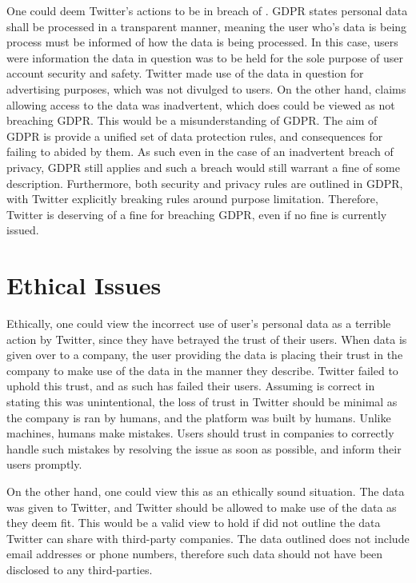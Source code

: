 \documentclass[a4paper, 11pt]{article}
\begin{document}
One could deem Twitter's actions to be in breach of \textcite{_regulation_2016}.
GDPR states personal data shall be processed in a transparent manner, meaning the user who's data is being process must be informed of how the data is being processed.
In this case, users were information the data in question was to be held for the sole purpose of user account security and safety.
Twitter made use of the data in question for advertising purposes, which was not divulged to users.
On the other hand, \textcite{support_personal_2019} claims allowing access to the data was inadvertent, which does could be viewed as not breaching GDPR.
This would be a misunderstanding of GDPR.
The aim of GDPR is provide a unified set of data protection rules, and consequences for failing to abided by them.
As such even in the case of an inadvertent breach of privacy, GDPR still applies and such a breach would still warrant a fine of some description.
Furthermore, both security and privacy rules are outlined in GDPR, with Twitter explicitly breaking rules around purpose limitation.
Therefore, Twitter is deserving of a fine for breaching GDPR, even if no fine is currently issued.

\section{Ethical Issues}
Ethically, one could view the incorrect use of user's personal data as a terrible action by Twitter, since they have betrayed the trust of their users.
When data is given over to a company, the user providing the data is placing their trust in the company to make use of the data in the manner they describe.
Twitter failed to uphold this trust, and as such has failed their users.
Assuming \textcite{support_twitter_2019} is correct in stating this was unintentional, the loss of trust in Twitter should be minimal as the company is ran by humans, and the platform was built by humans.
Unlike machines, humans make mistakes.
Users should trust in companies to correctly handle such mistakes by resolving the issue as soon as possible, and inform their users promptly.

On the other hand, one could view this as an ethically sound situation.
The data was given to Twitter, and Twitter should be allowed to make use of the data as they deem fit.
This would be a valid view to hold if \textcite{twitter_privacy_2018} did not outline the data Twitter can share with third-party companies.
The data outlined does not include email addresses or phone numbers, therefore such data should not have been disclosed to any third-parties.
\end{document}
